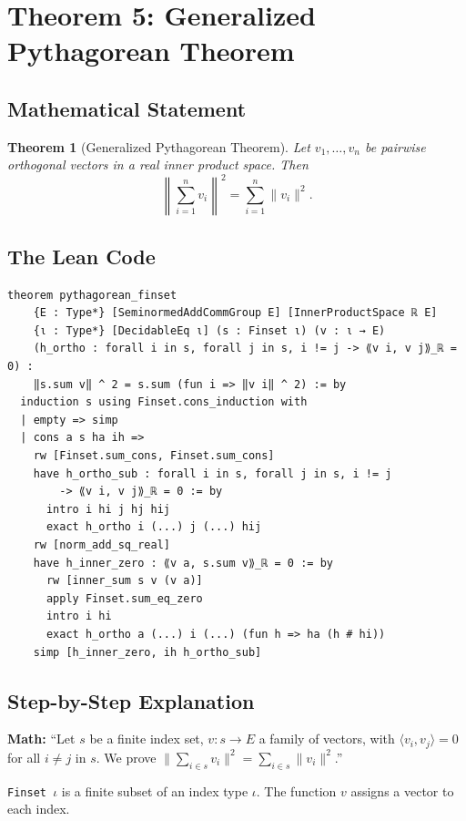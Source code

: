\documentclass[11pt]{article}
\theoremstyle{plain}
\newtheorem{theorem}{Theorem}[section]
\theoremstyle{definition}
\begin{document}
\section{Theorem 5: Generalized Pythagorean Theorem}

\subsection{Mathematical Statement}

\begin{theorem}[Generalized Pythagorean Theorem]
Let $v_1, \ldots, v_n$ be pairwise orthogonal vectors in a real inner product
space. Then
\[
  \left\|\sum_{i=1}^{n} v_i\right\|^2 = \sum_{i=1}^{n} \|v_i\|^2.
\]
\end{theorem}

\subsection{The Lean Code}

\begin{lstlisting}
theorem pythagorean_finset
    {E : Type*} [SeminormedAddCommGroup E] [InnerProductSpace ℝ E]
    {ι : Type*} [DecidableEq ι] (s : Finset ι) (v : ι → E)
    (h_ortho : forall i in s, forall j in s, i != j -> ⟪v i, v j⟫_ℝ = 0) :
    ‖s.sum v‖ ^ 2 = s.sum (fun i => ‖v i‖ ^ 2) := by
  induction s using Finset.cons_induction with
  | empty => simp
  | cons a s ha ih =>
    rw [Finset.sum_cons, Finset.sum_cons]
    have h_ortho_sub : forall i in s, forall j in s, i != j
        -> ⟪v i, v j⟫_ℝ = 0 := by
      intro i hi j hj hij
      exact h_ortho i (...) j (...) hij
    rw [norm_add_sq_real]
    have h_inner_zero : ⟪v a, s.sum v⟫_ℝ = 0 := by
      rw [inner_sum s v (v a)]
      apply Finset.sum_eq_zero
      intro i hi
      exact h_ortho a (...) i (...) (fun h => ha (h # hi))
    simp [h_inner_zero, ih h_ortho_sub]
\end{lstlisting}

\subsection{Step-by-Step Explanation}

\begin{tcolorbox}[title=Lines 1--5: Declaration]
\textbf{Math:} ``Let $s$ be a finite index set, $v\colon s \to E$ a family of
vectors, with $\langle v_i, v_j\rangle = 0$ for all $i \neq j$ in $s$.
We prove $\|\sum_{i \in s} v_i\|^2 = \sum_{i \in s} \|v_i\|^2$.''

\texttt{Finset $\iota$} is a finite subset of an index type $\iota$.
The function $v$ assigns a vector to each index.
\end{tcolorbox}
\end{document}
